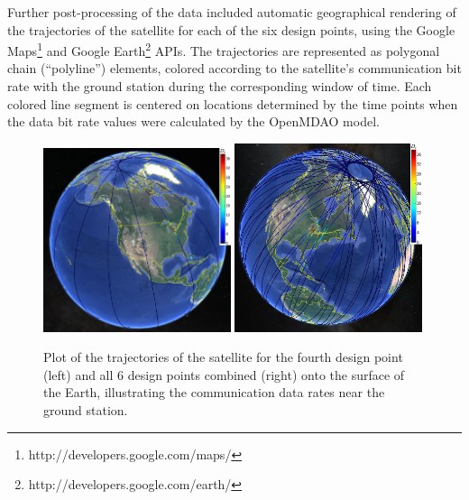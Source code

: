 \documentclass[]{aiaa-tc} %
\begin{document}
        Further post-processing of the data included automatic geographical rendering of the trajectories of
        the  satellite for each of the six design points, using the Google
        Maps\footnote{http://developers.google.com/maps/} and Google
        Earth\footnote{http://developers.google.com/earth/} APIs. The trajectories are
        represented as polygonal chain (``polyline'') elements, colored according to the
        satellite's communication bit rate with the ground station during the corresponding
        window of time. Each colored line segment is centered on locations
        determined by the time points when the data bit rate values were calculated
        by the OpenMDAO model.

         \begin{figure}[!htb]
            \centering
            \includegraphics[width=0.49\textwidth]{images/pt3_gearth3}
            \includegraphics[width=0.49\textwidth]{images/allpts_gearth2}
            \caption{Plot of the trajectories of the satellite
            for the fourth design point (left) and all 6 design points combined (right) onto the surface of the Earth, illustrating the
            communication data rates near the ground station.
            \label{fig:trajectories1}
            }
        \end{figure}
\end{document}
